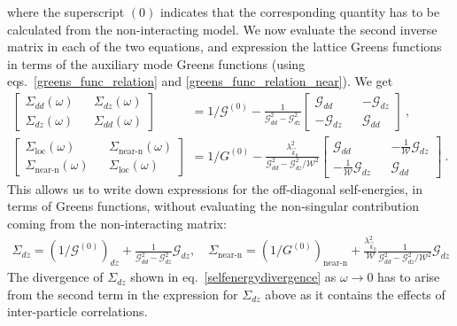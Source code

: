 \documentclass[prb]{revtex4-2}
\begin{document}
where the superscript \((0)\) indicates that the corresponding quantity has to be calculated from the non-interacting model. We now evaluate the second inverse matrix in each of the two equations, and expression the lattice Greens functions in terms of the auxiliary mode Greens functions (using eqs.~\ref{greens_func_relation} and \ref{greens_func_relation_near}). We get
\begin{equation}\begin{aligned}
	\begin{bmatrix} \Sigma_{dd}(\omega) && \Sigma_{dz}(\omega) \\ \Sigma_{dz}(\omega) && \Sigma_{dd}(\omega)\end{bmatrix} &= 1/\mathcal{G}^{(0)} - \frac{1}{\mathcal{G}_{dd}^2 - \mathcal{G}_{dz}^2}\begin{bmatrix} \mathcal{G}_{dd} && -\mathcal{G}_{dz} \\ -\mathcal{G}_{dz} && \mathcal{G}_{dd}\end{bmatrix}~,\\
	\begin{bmatrix} \Sigma_\text{loc}(\omega) && \Sigma_\text{near-n}(\omega) \\ \Sigma_\text{near-n}(\omega) && \Sigma_\text{loc}(\omega)\end{bmatrix} &= 1/G^{(0)} - \frac{\lambda_{\vec k_0}^2}{\mathcal{G}_{dd}^2 - \mathcal{G}_{dz}^2 / \mathcal{W}^2}\begin{bmatrix} \mathcal{G}_{dd} && -\frac{1}{\mathcal{W}}\mathcal{G}_{dz} \\ -\frac{1}{\mathcal{W}}\mathcal{G}_{dz} && \mathcal{G}_{dd}\end{bmatrix}~.
\end{aligned}\end{equation}
This allows us to write down expressions for the off-diagonal self-energies, in terms of Greens functions, without evaluating the non-singular contribution coming from the non-interacting matrix:
\begin{equation}\begin{aligned}
	\Sigma_{dz} = \left(1/\mathcal{G}^{(0)}\right)_{dz} + \frac{1}{\mathcal{G}_{dd}^2 - \mathcal{G}_{dz}^2} \mathcal{G}_{dz},\quad \Sigma_\text{near-n} = \left(1/G^{(0)}\right)_\text{near-n} + \frac{\lambda_{\vec k_0}^2}{\mathcal{W}}\frac{1}{\mathcal{G}_{dd}^2 - \mathcal{G}_{dz}^2 / \mathcal{W}^2} \mathcal{G}_{dz}
\end{aligned}\end{equation}
The divergence of \(\Sigma_{dz}\) shown in eq.~\ref{selfenergydivergence} as \(\omega \to 0\) has to arise from the second term in the expression for \(\Sigma_{dz}\) above as it contains the effects of inter-particle correlations.
\end{document}
